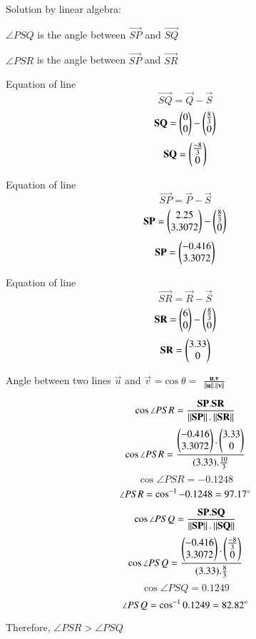 Solution by linear algebra:

$\angle{PSQ}$ is the angle between $\vec{SP}$ and $\vec{SQ}$

$\angle{PSR}$ is the angle between $\vec{SP}$ and $\vec{SR}$

Equation of line $$\vec{SQ} = \vec{Q}-\vec{S}$$
$$\mathbf{SQ} = \begin{pmatrix}0\\0\end{pmatrix} - \begin{pmatrix}\frac{8}{3}\\0\end{pmatrix}$$
$$\mathbf{SQ} = \begin{pmatrix}\frac{-8}{3}\\0\end{pmatrix}$$

Equation of line $$\vec{SP} = \vec{P}-\vec{S}$$
$$\mathbf{SP} = \begin{pmatrix}2.25\\3.3072\end{pmatrix} - \begin{pmatrix}\frac{8}{3}\\0\end{pmatrix}$$
$$\mathbf{SP} = \begin{pmatrix}-0.416\\3.3072\end{pmatrix}$$

Equation of line $$\vec{SR} = \vec{R}-\vec{S}$$
$$\mathbf{SR} = \begin{pmatrix}6\\0\end{pmatrix} - \begin{pmatrix}\frac{8}{3}\\0\end{pmatrix}$$
$$\mathbf{SR} = \begin{pmatrix}3.33\\0\end{pmatrix}$$

Angle between two lines $\vec{u}$ and $\vec{v}$ =$\cos{\theta}=$ $\frac{\mathbf{u}.\mathbf{v}}{\left\lVert\mathbf{u}\right\rVert.\left\lVert\mathbf{v}\right\rVert}$

$$\cos{\angle{PSR}} = \frac{\mathbf{SP}.\mathbf{SR}}{\left\lVert\mathbf{SP}\right\rVert.\left\lVert\mathbf{SR}\right\rVert}$$
$$\cos{\angle{PSR}} = \frac{\begin{pmatrix}-0.416\\3.3072\end{pmatrix}.\begin{pmatrix}3.33\\0\end{pmatrix}}{(3.33).\frac{10}{3}}$$
$$\cos{\angle{PSR}} = -0.1248$$
$$\angle{PSR} = \cos^{-1}{-0.1248} = 97.17\degree$$

$$\cos{\angle{PSQ}} = \frac{\mathbf{SP}.\mathbf{SQ}}{\left\lVert\mathbf{SP}\right\rVert.\left\lVert\mathbf{SQ}\right\rVert}$$
$$\cos{\angle{PSQ}} = \frac{\begin{pmatrix}-0.416\\3.3072\end{pmatrix}.\begin{pmatrix}\frac{-8}{3}\\0\end{pmatrix}}{(3.33).\frac{8}{3}}$$
$$\cos{\angle{PSQ}} = 0.1249$$
$$\angle{PSQ} = \cos^{-1}{0.1249} = 82.82\degree$$

Therefore, $\angle{PSR}>\angle{PSQ}$